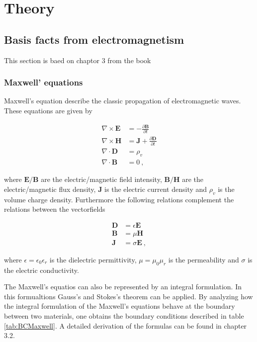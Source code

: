 \section{Theory}

\subsection{Basis facts from electromagnetism}

This section is baed on chaptor 3 from the book \cite{wartak2013computational}


\subsubsection{Maxwell' equations}

Maxwell's equation describe the classic propagation of electromagnetic waves. These equations are given by

\begin{align}
\nabla \times \boldsymbol{E} &= - \frac{\partial \boldsymbol{B}}{\partial t} \\
\nabla \times \boldsymbol{H} &= \boldsymbol{J} + \frac{\partial \boldsymbol{D}}{\partial t} \\
\nabla \cdot \boldsymbol{D} &= \rho_v \\
\nabla \cdot \boldsymbol{B} &= 0~, 
\end{align}

where $\boldsymbol{E} / \boldsymbol{B}$ are the electric/magnetic field intensity, $\boldsymbol{B} / \boldsymbol{H}$ are the electric/magnetic flux density, $\boldsymbol{J}$ is the electric current density and $\rho_v$ is the volume charge density. Furthermore the following relations complement the relations between the vectorfields

\begin{align}
\boldsymbol{D} &= \epsilon \boldsymbol{E} \\
\boldsymbol{B} &= \mu \boldsymbol{H} \\
\boldsymbol{J} &= \sigma \boldsymbol{E}~,
\end{align}

where $\epsilon = \epsilon_0 \epsilon_r$ is the dielectric permittivity,  $\mu = \mu_0 \mu_r$ is the permeability and $\sigma$ is the electric conductivity.

The Maxwell's equatios can also be represented by an integral formulation. In this formualtions Gauss's and Stokes's theorem can be applied. By analyzing how the integral formulation of the Maxwell's equations behave at the boundary between two materials, one obtains the boundary conditions described in table \ref{tab:BCMaxwell}. A detailed derivation of the formulas can be found in \cite{wartak2013computational} chapter 3.2.

